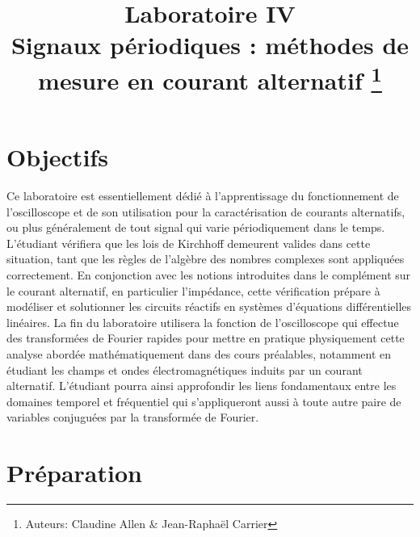 \documentclass[canadien,12pt,oneside,letterpaper]{article}
\title{\textbf{Laboratoire IV}\\Signaux périodiques : méthodes de mesure en courant alternatif \thanks{Auteurs: Claudine Allen \& Jean-Raphaël Carrier}}
\date{}
\begin{document}
\maketitle \vspace{-1cm}

\section{Objectifs}

Ce laboratoire est essentiellement dédié à l’apprentissage du fonctionnement de l’oscilloscope et de son utilisation pour la caractérisation de courants alternatifs, ou plus généralement de tout signal qui varie périodiquement dans le temps. L’étudiant vérifiera que les lois de Kirchhoff demeurent valides dans cette situation, tant que les règles de l’algèbre des nombres complexes sont appliquées correctement. En conjonction avec les notions introduites dans le complément sur le courant alternatif, en particulier l’impédance, cette vérification prépare à modéliser et solutionner les circuits réactifs en systèmes d’équations différentielles linéaires. La fin du laboratoire utilisera la fonction de l’oscilloscope qui effectue des transformées de Fourier rapides pour mettre en pratique physiquement cette analyse abordée mathématiquement dans des cours préalables, notamment en étudiant les champs et ondes électromagnétiques induits par un courant alternatif. L’étudiant pourra ainsi approfondir les liens fondamentaux entre les domaines temporel et fréquentiel qui s’appliqueront aussi à toute autre paire de variables conjuguées par la transformée de Fourier.

\newpage

\section{Préparation}
\end{document}

